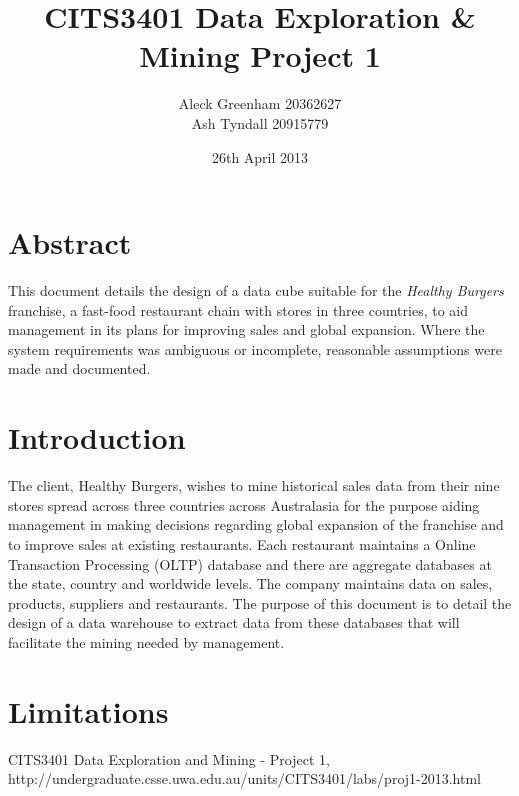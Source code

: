 \documentclass[12pt, a4paper]{article}
\newcommand{\subtitle}[1]{%
  \posttitle{%
    \par\end{center}
    \begin{center}\large#1\end{center}
    \vskip0.5em}%
}
\begin{document}
\title{CITS3401 Data Exploration \& Mining Project 1}
\subtitle{Healthy Burgers Fast Food Chain}
\author{Aleck Greenham 20362627 \\ Ash Tyndall 20915779}
\date{26th April 2013}

\maketitle

\section*{Abstract}

This document details the design of a data cube suitable for the \textit{Healthy Burgers} franchise, a fast-food restaurant chain with stores in three countries, to aid management in its plans for improving sales and global expansion. Where the system requirements \cite{designdoc} was ambiguous or incomplete, reasonable assumptions were made and documented.

\section*{Introduction}

The client, Healthy Burgers, wishes to mine historical sales data from their nine stores spread across three countries across Australasia for the purpose aiding management in making decisions regarding global expansion of the franchise and to improve sales at existing restaurants. Each restaurant maintains a Online Transaction Processing (OLTP) database and there are aggregate databases at the state, country and worldwide levels. The company maintains data on sales, products, suppliers and restaurants. The purpose of this document is to detail the design of a data warehouse to extract data from these databases that will facilitate the mining needed by management.

\section*{Limitations}

\begin{thebibliography}{9}

	CITS3401 Data Exploration and Mining - Project 1,
	http://undergraduate.csse.uwa.edu.au/units/CITS3401/labs/proj1-2013.html
		
\end{thebibliography}


\end{document}
